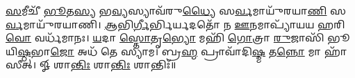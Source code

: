 \ul{𑌸}\-𑌮𑍀𑌚𑍀᳴ \ul{𑌭𑍂}\-𑌤\-\ul{𑌸𑍍𑌯} 𑌭\-\ul{𑌵𑍍𑌯}\-𑌸𑍍𑌯𑌾𑌵᳴𑌰𑍁\-\ul{𑌧𑍍𑌯𑍈} 𑌸\-\ul{𑌰𑍍𑌵}\-𑌮𑌾𑌯𑍁᳴𑌰𑌯𑌾\-\ul{𑌣𑌿} 𑌸\-\ul{𑌰𑍍𑌵}\-𑌮𑌾𑌯𑍁᳴𑌰𑌯𑌾𑌣𑌿। \ul{𑌆}\-𑌭𑌿\-\ul{𑌰𑍍𑌗𑍀}\-𑌰𑍍𑌭𑌿𑌰𑍍𑌯𑌦𑌤𑍋᳴ 𑌨 \ul{𑌊}\-𑌨𑌮𑌾𑌪𑍍𑌯𑌾᳴𑌯𑌯 𑌹𑌰𑌿\-\ul{𑌵𑍋} 𑌵𑌰𑍍𑌧᳴𑌮𑌾𑌨𑌃। \ul{𑌯}\-𑌦𑌾 \ul{𑌸𑍍𑌤𑍋}\-𑌤𑍃\-\ul{𑌭𑍍𑌯𑍋} 𑌮𑌹𑌿᳴ \ul{𑌗𑍋}\-𑌤𑍍𑌰𑌾 \ul{𑌰𑍁}\-𑌜𑌾𑌸𑌿᳴ 𑌭𑍂𑌯𑌿\-\ul{𑌷𑍍𑌠}\-𑌭𑌾\-\ul{𑌜𑍋} 𑌅𑌧᳴ 𑌤𑍇 𑌸𑍍𑌯𑌾𑌮। 𑌬𑍍𑌰\-\ul{𑌹𑍍𑌮} 𑌪𑍍𑌰𑌾𑌵𑌾᳴𑌦𑌿\-\ul{𑌷𑍍𑌮} 𑌤\-\ul{𑌨𑍍𑌨𑍋} 𑌮𑌾 𑌹𑌾᳴𑌸𑍀𑌤𑍍। 𑍐 𑌶𑌾\-\ul{𑌨𑍍𑌤𑌿𑌃} 𑌶𑌾\-\ul{𑌨𑍍𑌤𑌿𑌃} 𑌶𑌾𑌨𑍍𑌤𑌿𑌃᳴॥
